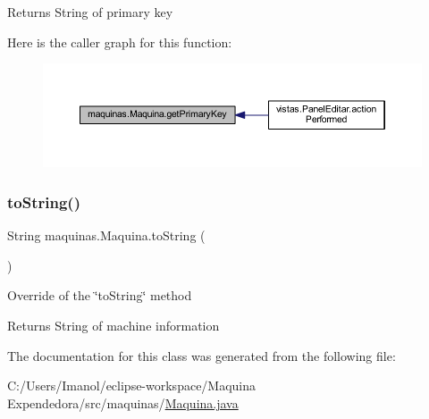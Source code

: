 \begin{DoxyReturn}{Returns}
String of primary key 
\end{DoxyReturn}
Here is the caller graph for this function\+:
\nopagebreak
\begin{figure}[H]
\begin{center}
\leavevmode
\includegraphics[width=350pt]{classmaquinas_1_1_maquina_a96e2d5af0f84acd39c23cc43d513f3ee_icgraph}
\end{center}
\end{figure}
\mbox{\label{classmaquinas_1_1_maquina_ada0867d43ce0cbaf143f33f8104f8e12}} 
\subsubsection{\texorpdfstring{to\+String()}{toString()}}
{\footnotesize\ttfamily String maquinas.\+Maquina.\+to\+String (\begin{DoxyParamCaption}{ }\end{DoxyParamCaption})}

Override of the \char`\"{}to\+String\char`\"{} method \begin{DoxyReturn}{Returns}
String of machine information 
\end{DoxyReturn}


The documentation for this class was generated from the following file\+:\begin{DoxyCompactItemize}
\item 
C\+:/\+Users/\+Imanol/eclipse-\/workspace/\+Maquina Expendedora/src/maquinas/\mbox{\hyperlink{_maquina_8java}{Maquina.\+java}}\end{DoxyCompactItemize}
